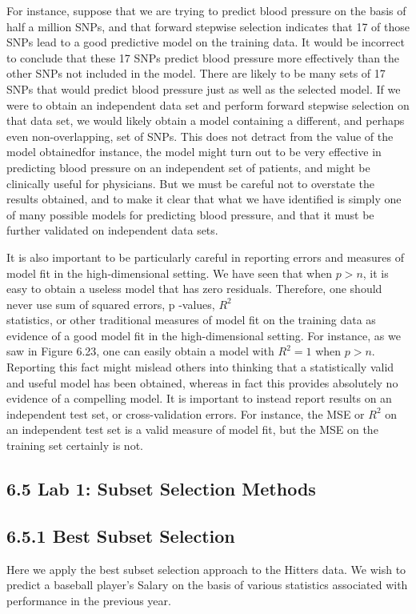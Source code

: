 \documentclass[10pt]{article}
\begin{document}
For instance, suppose that we are trying to predict blood pressure on the basis of half a million SNPs, and that forward stepwise selection indicates that 17 of those SNPs lead to a good predictive model on the training data. It would be incorrect to conclude that these 17 SNPs predict blood pressure more effectively than the other SNPs not included in the model. There are likely to be many sets of 17 SNPs that would predict blood pressure just as well as the selected model. If we were to obtain an independent data set and perform forward stepwise selection on that data set, we would likely obtain a model containing a different, and perhaps even non-overlapping, set of SNPs. This does not detract from the value of the model obtainedfor instance, the model might turn out to be very effective in predicting blood pressure on an independent set of patients, and might be clinically useful for physicians. But we must be careful not to overstate the results obtained, and to make it clear that what we have identified is simply one of many possible models for predicting blood pressure, and that it must be further validated on independent data sets.

It is also important to be particularly careful in reporting errors and measures of model fit in the high-dimensional setting. We have seen that when $p>n$, it is easy to obtain a useless model that has zero residuals. Therefore, one should never use sum of squared errors, p -values, $R^{2}$\\
statistics, or other traditional measures of model fit on the training data as evidence of a good model fit in the high-dimensional setting. For instance, as we saw in Figure 6.23, one can easily obtain a model with $R^{2}=1$ when $p>n$. Reporting this fact might mislead others into thinking that a statistically valid and useful model has been obtained, whereas in fact this provides absolutely no evidence of a compelling model. It is important to instead report results on an independent test set, or cross-validation errors. For instance, the MSE or $R^{2}$ on an independent test set is a valid measure of model fit, but the MSE on the training set certainly is not.

\subsection*{6.5 Lab 1: Subset Selection Methods}
\subsection*{6.5.1 Best Subset Selection}
Here we apply the best subset selection approach to the Hitters data. We wish to predict a baseball player's Salary on the basis of various statistics associated with performance in the previous year.
\end{document}

